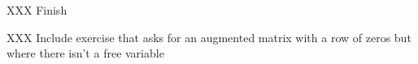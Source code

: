 
\begin{exercises}

	\begin{problist}
		\prob XXX Finish

		XXX Include exercise that asks for an augmented matrix with a row of zeros but where there isn't a free variable
	\end{problist}
\end{exercises}
